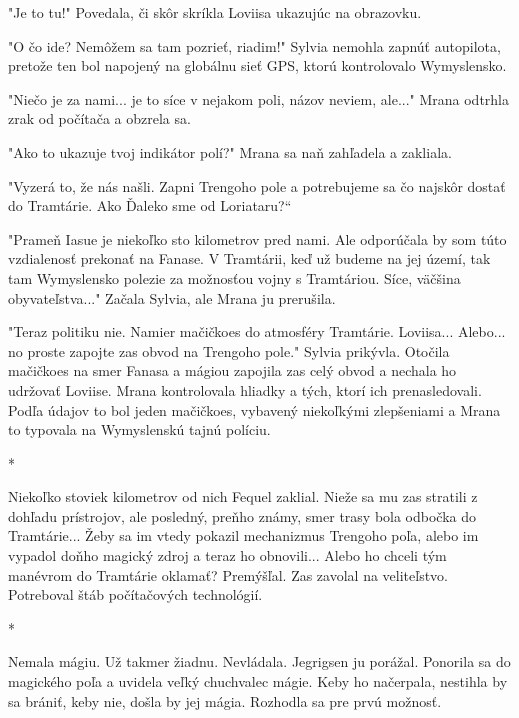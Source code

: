 \documentclass{book}
\begin{document}
"$ $Je to tu!"$ $ Povedala, či skôr skríkla Loviisa ukazujúc na obrazovku.

"$ $O čo ide? Nemôžem sa tam pozrieť, riadim!"$ $ Sylvia nemohla zapnúť autopilota, pretože ten bol napojený na globálnu sieť GPS, ktorú kontrolovalo Wymyslensko.

"$ $Niečo je za nami... je to síce v nejakom poli, názov neviem, ale..."$ $ Mrana odtrhla zrak od počítača a obzrela sa.

"$ $Ako to ukazuje tvoj indikátor polí?"$ $ Mrana sa naň zahľadela a zakliala.

"$ $Vyzerá to, že nás našli. Zapni Trengoho pole a potrebujeme sa čo najskôr dostať do Tramtárie. Ako Ďaleko sme od Loriataru?“

"$ $Prameň Iasue je niekoľko sto kilometrov pred nami. Ale odporúčala by som túto vzdialenosť prekonať na Fanase. V Tramtárii, keď už budeme na jej území, tak tam Wymyslensko polezie za možnosťou vojny s Tramtáriou. Síce, väčšina obyvateľstva..."$ $ Začala Sylvia, ale Mrana ju prerušila.

"$ $Teraz politiku nie. Namier mačičkoes do atmosféry Tramtárie. Loviisa... Alebo... no proste zapojte zas obvod na Trengoho pole."$ $ Sylvia prikývla. Otočila mačičkoes na smer Fanasa a mágiou zapojila zas celý obvod a nechala ho udržovať Loviise. Mrana kontrolovala hliadky a tých, ktorí ich prenasledovali. Podľa údajov to bol jeden mačičkoes, vybavený niekoľkými zlepšeniami a Mrana to typovala na Wymyslenskú tajnú políciu.

\begin{center}

*

\end{center}

Niekoľko stoviek kilometrov od nich Fequel zaklial. Nieže sa mu zas stratili z dohľadu prístrojov, ale posledný, preňho známy, smer trasy bola odbočka do Tramtárie... Žeby sa im vtedy pokazil mechanizmus Trengoho poľa, alebo im vypadol doňho magický zdroj a teraz ho obnovili... Alebo ho chceli tým manévrom do Tramtárie oklamať? Premýšľal. Zas zavolal na veliteľstvo. Potreboval štáb počítačových technológií.

\begin{center}

*

\end{center}

Nemala mágiu. Už takmer žiadnu. Nevládala. Jegrigsen ju porážal. Ponorila sa do magického poľa a uvidela veľký chuchvalec mágie. Keby ho načerpala, nestihla by sa brániť, keby nie, došla by jej mágia. Rozhodla sa pre prvú možnosť.
\end{document}
